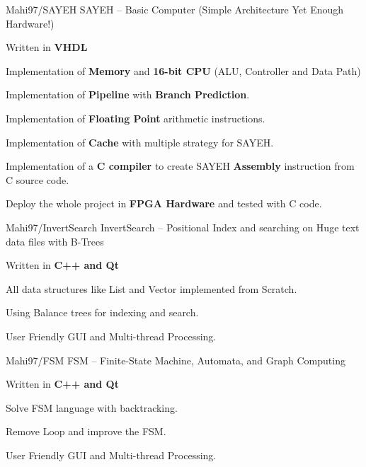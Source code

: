 \begin{cventries}
    \cventry
    {Mahi97/SAYEH} %
    {SAYEH -- Basic Computer (Simple Architecture Yet Enough Hardware!)} %
    {} %
    {} %
    {
      \begin{cvitems} %
        \item {Written in \textbf{VHDL}}
        \item {Implementation of \textbf{Memory} and \textbf{16-bit CPU} (ALU, Controller and Data Path)}
        \item {Implementation of \textbf{Pipeline} with \textbf{Branch Prediction}.}
        \item {Implementation of \textbf{Floating Point} arithmetic instructions.}
        \item {Implementation of \textbf{Cache} with multiple strategy for SAYEH.}
        \item {Implementation of a \textbf{C compiler} to create SAYEH \textbf{Assembly} instruction from C source code.}
        \item {Deploy the whole project in \textbf{FPGA Hardware} and tested with C code.}
      \end{cvitems}
    }
    
    \cventry
    {Mahi97/InvertSearch} %
    {InvertSearch -- Positional Index and searching on Huge text data files with B-Trees} %
    {} %
    {} %
    {
      \begin{cvitems} %
        \item {Written in \textbf{C++ and Qt}}
        \item {All data structures like List and Vector implemented from Scratch.}
        \item {Using Balance trees for indexing and search.}
        \item {User Friendly GUI and Multi-thread Processing.}
      \end{cvitems}
    }
    
    \cventry
    {Mahi97/FSM} %
    {FSM -- Finite-State Machine, Automata, and Graph Computing} %
    {} %
    {} %
    {
      \begin{cvitems} %
        \item {Written in \textbf{C++ and Qt}}
        \item {Solve FSM language with backtracking.}
        \item {Remove Loop and improve the FSM.}
        \item {User Friendly GUI and Multi-thread Processing.}
      \end{cvitems}
    }


\end{cventries}
